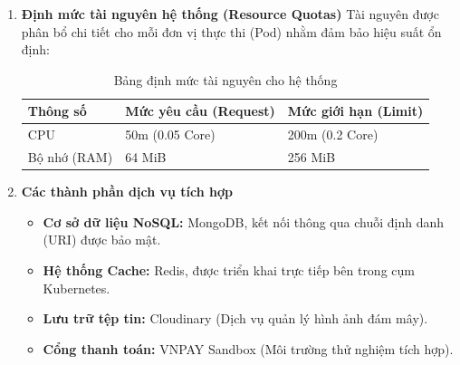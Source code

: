 \begin{itemize}
\begin{enumerate}
		\begin{itemize}[leftmargin=*, label=\textbullet, topsep=0.3em]
			\item \textbf{Hệ điều hành:} Amazon Linux (Truy cập quản trị qua tài khoản
			\texttt{ec2-user}).
			\item \textbf{Nền tảng điều phối:} K3s (Lightweight Kubernetes).
			\item \textbf{Kiến trúc hệ thống:} \texttt{linux/amd64}.
			\item \textbf{Mô hình triển khai:} High Availability với 02 bản sao (Replicas)
			chạy song song.
		\end{itemize}
		
		\item \textbf{Định mức tài nguyên hệ thống (Resource Quotas)}
		Tài nguyên được phân bổ chi tiết cho mỗi đơn vị thực thi (Pod) nhằm đảm bảo
		hiệu suất ổn định:
		
		\vspace{0.5em}
		\begin{table}[ht] %
			\centering %
			\begin{tabular}{lll}
				\toprule
				\textbf{Thông số} & \textbf{Mức yêu cầu (Request)} & \textbf{Mức giới hạn (Limit)} \\
				\midrule
				CPU               & 50m (0.05 Core)                & 200m (0.2 Core)               \\
				Bộ nhớ (RAM)      & 64 MiB                         & 256 MiB                       \\
				\bottomrule
			\end{tabular}
			\caption{Bảng định mức tài nguyên cho hệ thống} %
			\label{tab:dinh-muc-tai-nguyen} %
		\end{table}
		\vspace{0.5em}
		
		\item \textbf{Các thành phần dịch vụ tích hợp}
		
		\begin{itemize}[leftmargin=*, label=\textbullet, topsep=0.3em]
			\item \textbf{Cơ sở dữ liệu NoSQL:} MongoDB, kết nối thông qua chuỗi định
			danh (URI) được bảo mật.
			\item \textbf{Hệ thống Cache:} Redis, được triển khai trực tiếp bên trong
			cụm Kubernetes.
			\item \textbf{Lưu trữ tệp tin:} Cloudinary (Dịch vụ quản lý hình ảnh đám mây).
			\item \textbf{Cổng thanh toán:} VNPAY Sandbox (Môi trường thử nghiệm tích hợp).
		\end{itemize}
		

\end{enumerate}
\end{itemize}
